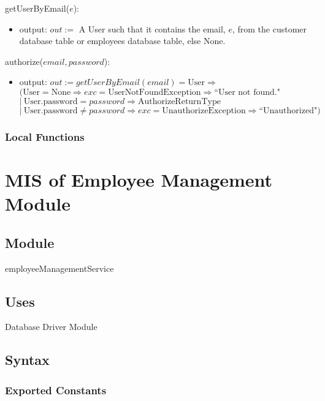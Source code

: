 \documentclass[12pt, titlepage]{article}
\begin{document}
\noindent getUserByEmail($e$):
\begin{itemize}
	\item output: $out :=$ A User such that it contains the email, $e$, from the customer database table or
	      employees database table, else None.
\end{itemize}

\noindent authorize($email, password$):
\begin{itemize}
	\item output: $out := getUserByEmail(email) = \text{User} \Rightarrow $ \\ $(\text{User} = \text{None}
		      \Rightarrow exc = \text{UserNotFoundException} \Rightarrow \text{``User not found."}$ \\ $|\
		      \text{User.password} = password \Rightarrow \text{AuthorizeReturnType}$ \\ $|\ \text{User.password}
		      \neq password \Rightarrow exc = \text{UnauthorizeException} \Rightarrow \text{``Unauthorized"})$
\end{itemize}

\subsubsection{Local Functions}

\newpage

\section{MIS of Employee Management Module} \label{mEmployeeManagement}
\subsection{Module}

employeeManagementService

\subsection{Uses}

Database Driver Module

\subsection{Syntax}

\subsubsection{Exported Constants}
\end{document}
